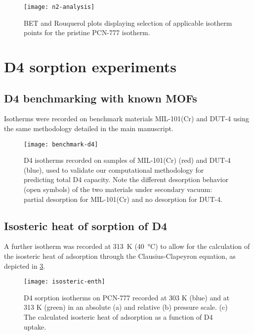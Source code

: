 \begin{figure}[H]
    \centering
    \texttt{[image: n2-analysis]}
    \caption{%
        BET and Rouquerol plots displaying selection of applicable
        isotherm points for the pristine PCN-777 isotherm.
    }\label{fig:n2-analysis}
\end{figure}

\pagebreak


\section{D4 sorption experiments}\label{d4-sorption-experiments}

\subsection{D4 benchmarking with known MOFs}\label{d4-benchmarking-with-known-mofs}

Isotherms were recorded on benchmark materials MIL-101(Cr) and DUT-4 using the
same methodology detailed in the main manuscript.

\begin{figure}[H]
    \centering
    \texttt{[image: benchmark-d4]}
    \caption{%
        D4 isotherms recorded on samples of MIL-101(Cr) (red) and
        DUT-4 (blue), used to validate our computational methodology for
        predicting total D4 capacity. Note the different desorption behavior
        (open symbols) of the two materials under secondary vacuum: partial
        desorption for MIL-101(Cr) and no desorption for DUT-4.
    }\label{fig:d4-benchmark}
\end{figure}

\subsection{Isosteric heat of sorption of D4}\label{isosteric-heat-of-sorption-of-d4}

A further isotherm was recorded at \SI{313}{\kelvin} (\SI{40}{\degreeCelsius})
to allow for the calculation of the isosteric heat of adsorption through the
Clausius-Clapeyron equation, as depicted in \cref{fig:isosteric-enth}.

\begin{figure}[H]
    \centering
    \texttt{[image: isosteric-enth]}
    \caption{%
        D4 sorption isotherms on PCN-777 recorded at 303 K (blue)
        and at 313 K (green) in an absolute (a) and relative (b) pressure scale.
        (c) The calculated isosteric heat of adsorption as a function of D4
        uptake.
    }\label{fig:isosteric-enth}
\end{figure}
